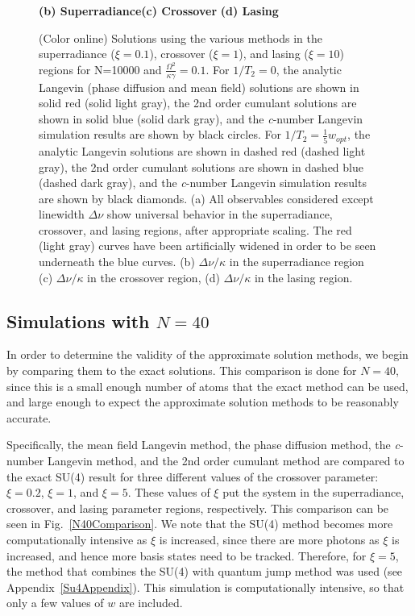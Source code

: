 \documentclass[aps,
twocolumn,
superscriptaddress,groupedaddress]{revtex4}
\begin{document}
\begin{figure}
\begin{center}
	\hspace{-10mm}\textbf{(b) Superradiance}\hspace{33mm}\textbf{(c) Crossover}
  \hspace{37mm}\textbf{(d) Lasing}
\end{center}
		\vspace{-5mm}
\caption{(Color online) Solutions using the various methods in the
superradiance ($\xi=0.1$), crossover ($\xi=1$), and lasing ($\xi=10$)
regions for N=10000 and $\frac{\Omega^2}{\kappa \gamma}=0.1$. For $1/T_2=0$, the analytic Langevin (phase diffusion and mean field) solutions are shown in solid red (solid light gray), the 2nd order
cumulant solutions are shown in solid blue (solid dark gray), and the
{\it c}-number Langevin simulation results are shown by black circles. For
$1/T_2=\frac{1}{5} w_{opt}$, the analytic Langevin solutions are shown in
dashed red (dashed light gray), the 2nd order cumulant solutions are shown
in dashed blue (dashed dark gray), and the {\it c}-number Langevin simulation
results are shown by black diamonds. (a) All observables considered
except linewidth  $\Delta \nu$ show universal behavior in the
superradiance, crossover, and lasing regions, after appropriate scaling.
The red (light gray) curves have been artificially widened in order to
be seen underneath the blue curves. (b)  $\Delta \nu / \kappa$ in the
superradiance region (c) $\Delta \nu / \kappa$ in the crossover region,
(d) $\Delta \nu / \kappa$ in the lasing region.}
 \label{N10000Comparison}
\end{figure}


\subsection{Simulations with $N=40$}

In order to determine the validity of the approximate solution methods, we begin by comparing them to the exact solutions. This comparison is done for $N=40$, since this is a small enough number of atoms that the exact method can be used, and large enough to expect the approximate solution methods to be reasonably accurate. 

Specifically, the mean field Langevin method, the phase diffusion method, the {\it c}-number Langevin method, and the 2nd order cumulant method are compared to the exact SU(4) result for three different values of the crossover parameter:
$\xi=0.2$, $\xi=1$, and $\xi=5$. These values of $\xi$ put the system in the
superradiance, crossover, and lasing parameter regions, respectively.
This comparison can be seen in Fig.~\ref{N40Comparison}. We note that the SU(4) method becomes more computationally intensive as $\xi$ is increased, since there are more photons as $\xi$ is increased, and hence
more basis states need to be tracked. Therefore, for $\xi=5$, the method
that combines the SU(4) with quantum jump method was used (see Appendix~\ref{Su4Appendix}). This
simulation is computationally intensive, so that only a few values of $w$
are included.
\end{document}
